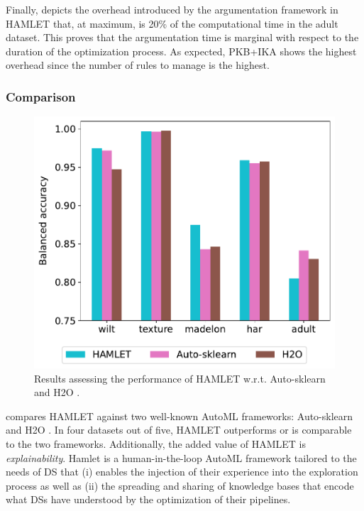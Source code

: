 Finally,  depicts the overhead introduced by the argumentation framework in HAMLET that, at maximum, is 20\% of the computational time in the adult dataset.
This proves that the argumentation time is marginal with respect to the duration of the optimization process.
As expected, PKB+IKA shows the highest overhead since the number of rules to manage is the highest.

\subsubsection{Comparison}

\begin{figure}[t]
    \centering
    \includegraphics[scale=.45]{chapters/part-automl/chapter-supervised/img-hamlet/comparison.pdf}
    \caption{Results assessing the performance of HAMLET w.r.t. Auto-sklearn \cite{feurer2019auto} and H2O \cite{ledell2020h2o}.}
    \label{fig:comparison}
\end{figure}


 compares HAMLET against two well-known AutoML frameworks: Auto-sklearn \cite{feurer2019auto} and H2O \cite{ledell2020h2o}.
In four datasets out of five, HAMLET outperforms or is comparable to the two frameworks.
Additionally, the added value of HAMLET is \textit{explainability}.
Hamlet is a human-in-the-loop AutoML framework tailored to the needs of DS that (i) enables the injection of their experience into the exploration process as well as (ii) the spreading and sharing of knowledge bases that encode what DSs have understood by the optimization of their pipelines.


